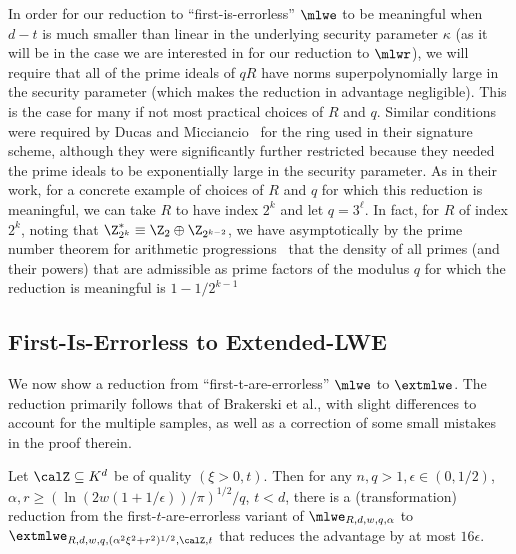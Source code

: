 In order for our reduction to ``first-is-errorless'' $\mlwe$ to be
meaningful when $d-t$ is much smaller than linear in the underlying
security parameter $\kappa$ (as it will be in the case we are
interested in for our reduction to $\mlwr$), we will require that all
of the prime ideals of $qR$ have norms superpolynomially large in the
security parameter (which makes the reduction in advantage
negligible). This is the case for many if not most practical choices
of $R$ and $q$. Similar conditions were required by Ducas and
Micciancio~\cite{DBLP:conf/crypto/DucasM14} for the ring used in their
signature scheme, although they were significantly further restricted
because they needed the prime ideals to be exponentially large in the
security parameter. As in their work, for a concrete example of
choices of $R$ and $q$ for which this reduction is meaningful, we can
take $R$ to have index $2^{k}$ and let $q=3^{\ell}$. In fact, for $R$
of index $2^{k}$, noting that $\Z_{2^k}^* \equiv \Z_2 \oplus
\Z_{2^{k-2}}$, we have asymptotically by the prime number theorem for
arithmetic progressions~\cite{soprounov2010short} that the density
of all primes (and their powers) that are admissible as prime factors of
the modulus $q$ for which the reduction is meaningful is $1-1/2^{k-1}$

\subsection{First-Is-Errorless to Extended-LWE}
\label{sec:first-errorl-extend}

We now show a reduction from ``first-t-are-errorless'' $\mlwe$ to
$\extmlwe$. The reduction primarily follows that of Brakerski et al.,
with slight differences to account for the multiple samples, as well
as a correction of some small mistakes in the proof therein. 
\begin{lemma}
Let $\calZ \subseteq K^d$ be of quality $(\xi > 0,t)$. Then for any $n, q
> 1, \epsilon \in (0,1/2)$, $\alpha, r \geq
(\ln(2w(1+1/\epsilon))/\pi)^{1/2}/q$, $t < d$, there is a (transformation)
reduction from the first-$t$-are-errorless variant of
$\mlwe_{R,d,w,q,\alpha}$ to
\\$\extmlwe_{R,d,w,q,(\alpha^2\xi^2+r^2)^{1/2},\calZ,t}$ that reduces
the advantage by at most $16\epsilon$. 
\end{lemma}

